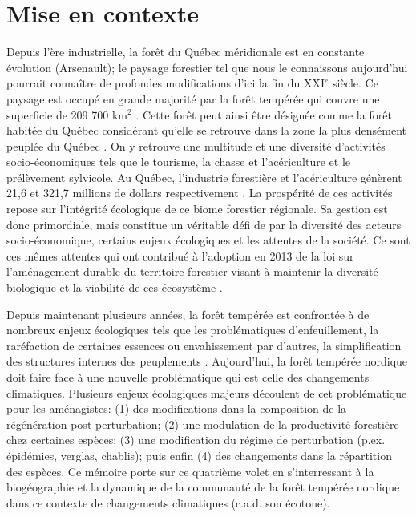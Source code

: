 
\section*{Mise en contexte}

Depuis l'ère industrielle, la forêt du Québec méridionale est en constante évolution (Arsenault); le
paysage forestier tel que nous le connaissons aujourd'hui pourrait connaître de profondes
modifications d'ici la fin du XXI$^e$ siècle. Ce paysage est occupé en grande majorité par la forêt
tempérée qui couvre une superficie de 209 700 km$^2$ \citep{Boulay2015}. Cette forêt peut ainsi être
désignée comme la forêt habitée du Québec considérant qu'elle se retrouve dans la zone la plus
densément peuplée du Québec \citep{Doyon2009}. On y retrouve une multitude et une diversité
d'activités socio-économiques tels que le tourisme, la chasse et l'acériculture et le prélèvement
sylvicole. Au Québec, l'industrie forestière et l'acériculture génèrent 21,6 et 321,7 millions de
dollars respectivement \citep{Boulay2015}. La prospérité de ces activités repose sur l'intégrité
écologique de ce biome forestier régionale. Sa gestion est donc primordiale, mais constitue un
véritable défi de par la diversité des acteurs socio-économique, certains enjeux écologiques et les
attentes de la société. Ce sont ces mêmes attentes qui ont contribué à l'adoption en 2013 de la loi sur l'aménagement durable du territoire forestier visant à maintenir la diversité biologique et la viabilité de ces écosystème \citep{Boulay2015}.

Depuis maintenant plusieurs années, la forêt tempérée est confrontée à de nombreux enjeux
écologiques tels que les problématiques d'enfeuillement, la raréfaction de certaines essences ou
envahissement par d’autres, la simplification des structures internes des peuplements
\citep{Varady-Szabo2008}. Aujourd'hui, la forêt tempérée nordique doit faire face à une nouvelle
problématique qui est celle des changements climatiques. Plusieurs enjeux écologiques majeurs
découlent de cet problématique pour les aménagistes: (1) des modifications dans la composition de la
régénération post-perturbation; (2) une modulation de la productivité forestière chez certaines
espèces; (3) une modification du régime de perturbation (p.ex. épidémies, verglas, chablis); puis
enfin (4) des changements dans la répartition des espèces. Ce mémoire porte sur ce quatrième volet
en s'interressant à la biogéographie et la dynamique de la communauté de la forêt tempérée nordique
dans ce contexte de changements climatiques (c.a.d. son écotone).

